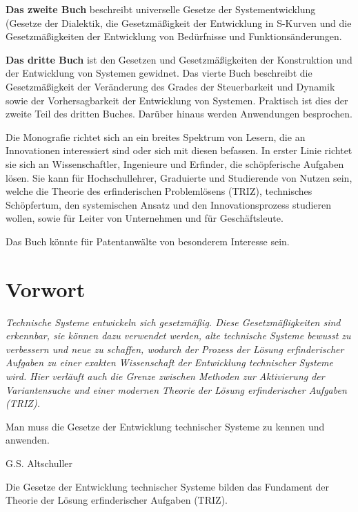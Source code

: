 \documentclass[11pt,a4paper]{article}
\begin{document}
\textbf{Das zweite Buch} beschreibt universelle Gesetze der Systementwicklung
(Gesetze der Dialektik, die Gesetzmäßigkeit der Entwicklung in S-Kurven und
die Gesetzmäßigkeiten der Entwicklung von Bedürfnisse und Funktionsänderungen.

\textbf{Das dritte Buch} ist den Gesetzen und Gesetzmäßigkeiten der
Konstruktion und der Entwicklung von Systemen gewidnet.  Das vierte Buch
beschreibt die Gesetzmäßigkeit der Verän\-derung des Grades der Steuerbarkeit
und Dynamik sowie der Vorhersagbarkeit der Entwicklung von Systemen. Praktisch
ist dies der zweite Teil des dritten Buches. Darüber hinaus werden Anwendungen
besprochen.

Die Monografie richtet sich an ein breites Spektrum von Lesern, die an
Innovationen interessiert sind oder sich mit diesen befassen. In erster Linie
richtet sie sich an Wissenschaftler, Ingenieure und Erfinder, die
schöpferische Aufgaben lösen. Sie kann für Hochschullehrer, Graduierte und
Studierende von Nutzen sein, welche die Theorie des erfinderischen
Problemlösens (TRIZ), technisches Schöpfertum, den systemischen Ansatz und den
Innovationsprozess studieren wollen, sowie für Leiter von Unternehmen und für
Geschäftsleute.

Das Buch könnte für Patentanwälte von besonderem Interesse sein.

\section*{Vorwort}

\begin{flushright}
  \begin{minipage}{.8\textwidth}\it
    Technische Systeme entwickeln sich gesetzmäßig. Diese Gesetzmäßigkeiten
    sind erkennbar, sie können dazu verwendet werden, alte technische Systeme
    bewusst zu verbessern und neue zu schaffen, wodurch der Prozess der Lösung
    erfinderischer Aufgaben zu einer exakten Wissenschaft der Entwicklung
    technischer Systeme wird. Hier verläuft auch die Grenze zwischen Methoden
    zur Aktivierung der Variantensuche und einer modernen Theorie der Lösung
    erfinderischer Aufgaben (TRIZ).

    Man muss die Gesetze der Entwicklung technischer Systeme zu kennen und
    anwenden.
    \begin{flushright}
      G.S. Altschuller
    \end{flushright}
  \end{minipage}
\end{flushright}
Die Gesetze der Entwicklung technischer Systeme bilden das Fundament der
Theorie der Lösung erfinderischer Aufgaben (TRIZ).
\end{document}
